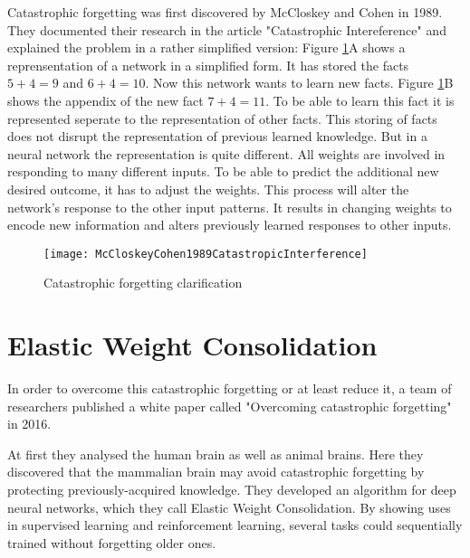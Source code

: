 Catastrophic forgetting was first discovered by McCloskey and Cohen in 1989.
They documented their research in the article "Catastrophic Intereference" \cite{psychology_learning_mccloskey_cohen} and explained the problem in a rather simplified version:
Figure \ref{fig:catastrophic_forgetting_clarification}A shows a reprensentation of a network in a simplified form.
It has stored the facts $5 + 4 = 9$ and $6 + 4 = 10$.
\hfill \break
Now this network wants to learn new facts.
Figure \ref{fig:catastrophic_forgetting_clarification}B shows the appendix of the new fact $7 + 4 = 11$.
To be able to learn this fact it is represented seperate to the representation of other facts.
This storing of facts does not disrupt the representation of previous learned knowledge.
\hfill \break
But in a neural network the representation is quite different.
All weights are involved in responding to many different inputs.
To be able to predict the additional new desired outcome, it has to adjust the weights.
This process will alter the network's response to the other input patterns.
It results in changing weights to encode new information and alters previously learned responses to other inputs.
\cite{psychology_learning_mccloskey_cohen}

\begin{figure}[H]
    \centering
    \texttt{[image: McCloskeyCohen1989CatastropicInterference]}
    \caption{\cite[page 148]{psychology_learning_mccloskey_cohen} Catastrophic forgetting clarification}
    \label{fig:catastrophic_forgetting_clarification}
\end{figure}

\section{Elastic Weight Consolidation}
\label{foundation_ewc}

In order to overcome this catastrophic forgetting or at least reduce it, a team of researchers published a white paper called "Overcoming catastrophic forgetting" in 2016.
\cite{elastic-weight-consolidation}

At first they analysed the human brain as well as animal brains.
Here they discovered that the mammalian brain may avoid catastrophic forgetting by protecting previously-acquired knowledge.
They developed an algorithm for deep neural networks, which they call Elastic Weight Consolidation.
By showing uses in supervised learning and reinforcement learning, several tasks could sequentially trained without forgetting older ones.
\cite{elastic-weight-consolidation}


